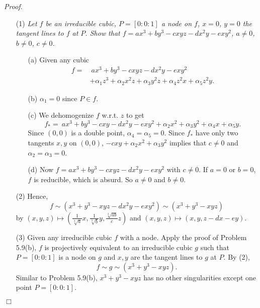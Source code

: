 \documentclass{article}
\begin{document}
\emph{Proof.}
\begin{enumerate}
\item[(1)]
  \emph{Let $f$ be an irreducible cubic, $P = [0:0:1]$ a node on $f$,
  $x=0$, $y=0$ the tangent lines to $f$ at $P$.
  Show that $f = ax^3 + by^3 - cxyz - dx^2 y - e xy^2$, $a \neq 0$, $b \neq 0$, $c \neq 0$.}
  \begin{enumerate}
  \item[(a)]
    Given any cubic
    \begin{align*}
      f
      =& \: ax^3 + by^3 - cxyz - dx^2 y - e xy^2 \\
        & + \alpha_1 z^3 + \alpha_2 x^2 z + \alpha_3 y^2 z + \alpha_4 z^2 x + \alpha_5 z^2 y.
    \end{align*}

  \item[(b)]
    $\alpha_1 = 0$ since $P \in f$.

  \item[(c)]
    We dehomogenize $f$ w.r.t. $z$ to get
    \[
      f_{*}
      = \: ax^3 + by^3 - cxy - dx^2 y - e xy^2
        + \alpha_2 x^2 + \alpha_3 y^2 + \alpha_4 x + \alpha_5 y.
    \]
    Since $(0,0)$ is a double point, $\alpha_4 = \alpha_5 = 0$.
    Since $f_{*}$ have only two tangents $x, y$ on $(0,0)$,
    $- cxy + \alpha_2 x^2 + \alpha_3 y^2$
    implies that $c \neq 0$ and $\alpha_2 = \alpha_3 = 0$.

  \item[(d)]
    Now $f = ax^3 + by^3 - cxyz - dx^2 y - e xy^2$ with $c \neq 0$.
    If $a = 0$ or $b = 0$, $f$ is reducible, which is absurd.
    So $a \neq 0$ and $b \neq 0$.
  \end{enumerate}

\item[(2)]
  Hence,
  \[
    f
    \sim (x^3 + y^3 - xyz - dx^2 y - e xy^2)
    \sim (x^3 + y^3 - xyz)
  \]
  by
  $(x,y,z) \mapsto
  \left( \frac{1}{\sqrt[3]{a}}x, \frac{1}{\sqrt[3]{b}}y, \frac{\sqrt[3]{ab}}{c}z \right)$
  and
  $(x,y,z) \mapsto (x, y, z - dx - ey)$.

\item[(3)]
  Given any irreducible cubic $f$ with a node.
  Apply the proof of Problem 5.9(b),
  $f$ is projectively equivalent to an irreducible cubic $g$
  such that $P = [0:0:1]$ is a node on $g$ and $x, y$ are the tangent lines to $g$ at $P$.
  By (2),
  \[
    f \sim g \sim (x^3 + y^3 - xyz).
  \]
  Similar to Problem 5.9(b),
  $x^3 + y^3 - xyz$ has no other singularities except one point $P = [0:0:1]$.
\end{enumerate}
$\Box$ \\\\
\end{document}
